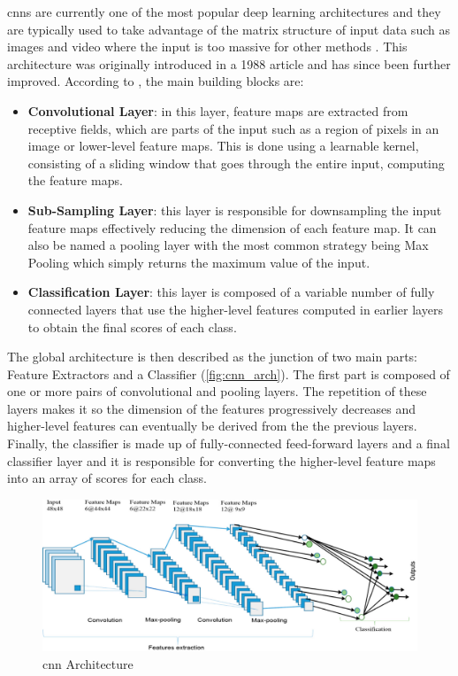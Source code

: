 \acfp{cnn} are currently one of the most popular deep learning architectures and they are typically used to take advantage of the matrix structure of input data such as images and video where the input is too massive for other methods \cite{Sarker2021}. This architecture was originally introduced in a 1988 article \cite{Fukushima1988} and has since been further improved. According to \textcite{Alom2019}, the main building blocks are:
\begin{itemize}
    \item \textbf{Convolutional Layer}: in this layer, feature maps are extracted from receptive fields, which are parts of the input such as a region of pixels in an image or lower-level feature maps. This is done using a learnable kernel, consisting of a sliding window that goes through the entire input, computing the feature maps.

    \item \textbf{Sub-Sampling Layer}: this layer is responsible for downsampling the input feature maps effectively reducing the dimension of each feature map. It can also be named a pooling layer with the most common strategy being Max Pooling which simply returns the maximum value of the input.

    \item \textbf{Classification Layer}: this layer is composed of a variable number of fully connected layers that use the higher-level features computed in earlier layers to obtain the final scores of each class.
\end{itemize}

The global architecture is then described as the junction of two main parts: Feature Extractors and a Classifier (\autoref{fig:cnn_arch}). The first part is composed of one or more pairs of convolutional and pooling layers. The repetition of these layers makes it so the dimension of the features progressively decreases and higher-level features can eventually be derived from the the previous layers. Finally, the classifier is made up of fully-connected feed-forward layers and a final classifier layer and it is responsible for converting the higher-level feature maps into an array of scores for each class.

\begin{figure}[ht]
    \centering
    \includegraphics[width=1\textwidth]{figs/cnn_arch.pdf}
    \caption[\acs{cnn} Architecture]{\acs{cnn} Architecture \cite{Alom2019}}
    \label{fig:cnn_arch}
\end{figure}

